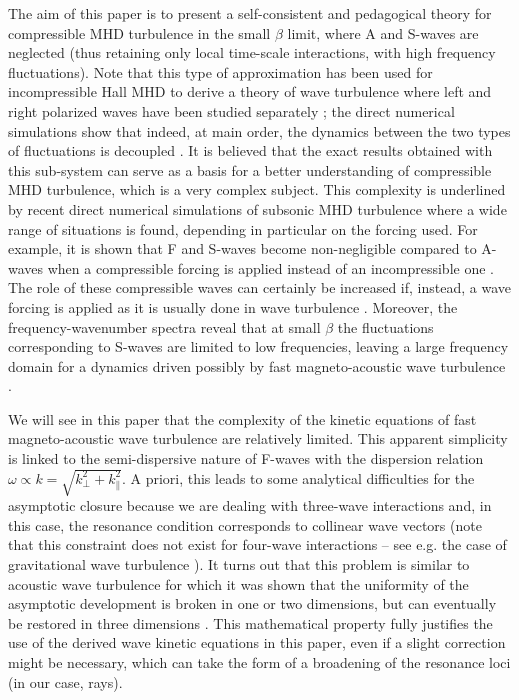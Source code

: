 \documentclass{jpp}
\begin{document}
The aim of this paper is to present a self-consistent and pedagogical theory for compressible MHD turbulence in the small $\beta$ limit, where A and S-waves are neglected (thus retaining only local time-scale interactions, with high frequency fluctuations). Note that this type of approximation has been used for incompressible Hall MHD to derive a theory of wave turbulence where left and right polarized waves have been studied separately \citep{Galtier2006}; the direct numerical simulations show that indeed, at main order, the dynamics between the two types of fluctuations is decoupled \citep{Meyrand2018}. 
It is believed that the exact results obtained with this sub-system can serve as a basis for a better understanding of compressible MHD turbulence, which is a very complex subject. This complexity is underlined by recent direct numerical simulations of subsonic MHD turbulence where a wide range of situations is found, depending in particular on the forcing used. For example, it is shown that F and S-waves become non-negligible compared to A-waves when a compressible forcing is applied instead of an incompressible one \citep{Andres2017,Makwana2020,Gan2022}. The role of these compressible waves can certainly be increased if, instead, a wave forcing is applied as it is usually done in wave turbulence \citep{LeReun2020}. Moreover, the frequency-wavenumber spectra reveal that at small $\beta$ the fluctuations corresponding to S-waves are limited to low frequencies, leaving a large frequency domain for a dynamics driven possibly by fast magneto-acoustic wave turbulence \citep{Andres2017,Brodiano2021}. 

We will see in this paper that the complexity of the kinetic equations of fast magneto-acoustic wave turbulence are relatively limited. This apparent simplicity is linked to the semi-dispersive nature of F-waves with the dispersion relation $\omega \propto k = \sqrt{k_\perp^2 + k_\parallel^2}$. A priori, this leads to some analytical difficulties for the asymptotic closure because we are dealing with three-wave interactions and, in this case, the resonance condition corresponds to collinear wave vectors (note that this constraint does not exist for four-wave interactions -- see e.g. the case of gravitational wave turbulence \citep{Galtier2017}). It turns out that this problem is similar to acoustic wave turbulence \citep{Zakharov1970} for which it was shown that the uniformity of the asymptotic development is broken in one or two dimensions, but can eventually be restored in three dimensions \citep{Benney1966,Newell1971,Lvov1997}. This mathematical property fully justifies the use of the derived wave kinetic equations in this paper, even if a slight correction might be necessary, which can take the form of a broadening of the resonance loci (in our case, rays). 
\end{document}
